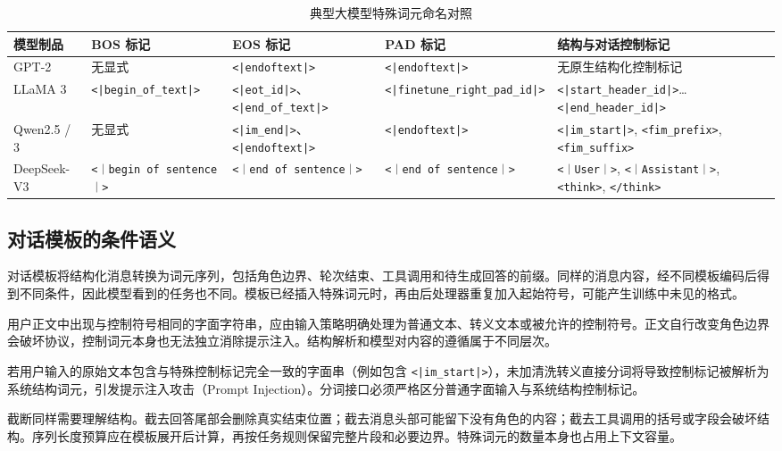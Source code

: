 \documentclass[../textbook.tex]{subfiles}
\begin{document}
\begin{table}[htbp]
\centering
\caption{典型大模型特殊词元命名对照}\label{tab:cross-arch-special-tokens}
\begin{tabularx}{\linewidth}{p{22mm}p{22mm}p{25mm}p{22mm}X}
\toprule
模型制品 & BOS 标记 & EOS 标记 & PAD 标记 & 结构与对话控制标记 \\\midrule
GPT-2 & 无显式 & \texttt{<|endoftext|>} & \texttt{<|endoftext|>} & 无原生结构化控制标记 \\
LLaMA 3 & \texttt{<|begin\_of\_text|>} & \texttt{<|eot\_id|>}、\texttt{<|end\_of\_text|>} & \texttt{<|finetune\_right\_pad\_id|>} & \texttt{<|start\_header\_id|>}\dots\texttt{<|end\_header\_id|>} \\
Qwen2.5 / 3 & 无显式 & \texttt{<|im\_end|>}、\texttt{<|endoftext|>} & \texttt{<|endoftext|>} & \texttt{<|im\_start|>}, \texttt{<fim\_prefix>}, \texttt{<fim\_suffix>} \\
DeepSeek-V3 & \texttt{<｜begin of sentence｜>} & \texttt{<｜end of sentence｜>} & \texttt{<｜end of sentence｜>} & \texttt{<｜User｜>}, \texttt{<｜Assistant｜>}, \texttt{<think>}, \texttt{</think>} \\
\bottomrule
\end{tabularx}
\end{table}

\subsection{对话模板的条件语义}
对话模板将结构化消息转换为词元序列，包括角色边界、轮次结束、工具调用和待生成回答的前缀。同样的消息内容，经不同模板编码后得到不同条件，因此模型看到的任务也不同。模板已经插入特殊词元时，再由后处理器重复加入起始符号，可能产生训练中未见的格式。

用户正文中出现与控制符号相同的字面字符串，应由输入策略明确处理为普通文本、转义文本或被允许的控制符号。正文自行改变角色边界会破坏协议，控制词元本身也无法独立消除提示注入。结构解析和模型对内容的遵循属于不同层次。

\begin{warning}[特殊词元转义与注入风险]
若用户输入的原始文本包含与特殊控制标记完全一致的字面串（例如包含 \texttt{<|im\_start|>}），未加清洗转义直接分词将导致控制标记被解析为系统结构词元，引发提示注入攻击（Prompt Injection）。分词接口必须严格区分普通字面输入与系统结构控制标记。
\end{warning}

截断同样需要理解结构。截去回答尾部会删除真实结束位置；截去消息头部可能留下没有角色的内容；截去工具调用的括号或字段会破坏结构。序列长度预算应在模板展开后计算，再按任务规则保留完整片段和必要边界。特殊词元的数量本身也占用上下文容量。
\end{document}
